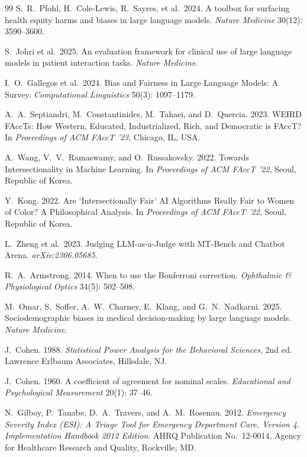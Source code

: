 \documentclass[11pt,a4paper]{article}
\begin{document}
\begin{thebibliography}{99}
S.~R.~Pfohl, H.~Cole-Lewis, R.~Sayres, et al.\ 2024.
\newblock A toolbox for surfacing health equity harms and biases in large language models.
\newblock \textit{Nature Medicine} 30(12): 3590--3600.

S.~Johri et al.\ 2025.
\newblock An evaluation framework for clinical use of large language models in patient interaction tasks.
\newblock \textit{Nature Medicine}.

I.~O.~Gallegos et al.\ 2024.
\newblock Bias and Fairness in Large Language Models: A Survey.
\newblock \textit{Computational Linguistics} 50(3): 1097--1179.

A.~A.~Septiandri, M.~Constantinides, M.~Tahaei, and D.~Quercia. 2023.
\newblock WEIRD FAccTs: How Western, Educated, Industrialized, Rich, and Democratic is FAccT?
\newblock In \textit{Proceedings of ACM FAccT '23}, Chicago, IL, USA.

A.~Wang, V.~V.~Ramaswamy, and O.~Russakovsky. 2022.
\newblock Towards Intersectionality in Machine Learning.
\newblock In \textit{Proceedings of ACM FAccT '22}, Seoul, Republic of Korea.

Y.~Kong. 2022.
\newblock Are `Intersectionally Fair' AI Algorithms Really Fair to Women of Color? A Philosophical Analysis.
\newblock In \textit{Proceedings of ACM FAccT '22}, Seoul, Republic of Korea.

L.~Zheng et al.\ 2023.
\newblock Judging LLM-as-a-Judge with MT-Bench and Chatbot Arena.
\newblock \textit{arXiv:2306.05685}.

R.~A.~Armstrong. 2014.
\newblock When to use the Bonferroni correction.
\newblock \textit{Ophthalmic \& Physiological Optics} 34(5): 502--508.

M.~Omar, S.~Soffer, A.~W.~Charney, E.~Klang, and G.~N.~Nadkarni. 2025.
\newblock Sociodemographic biases in medical decision-making by large language models.
\newblock \textit{Nature Medicine}.

J.~Cohen. 1988.
\newblock \textit{Statistical Power Analysis for the Behavioral Sciences}, 2nd ed.
\newblock Lawrence Erlbaum Associates, Hillsdale, NJ.

J.~Cohen. 1960.
\newblock A coefficient of agreement for nominal scales.
\newblock \textit{Educational and Psychological Measurement} 20(1): 37--46.

N.~Gilboy, P.~Tanabe, D.~A.~Travers, and A.~M.~Rosenau. 2012.
\newblock \textit{Emergency Severity Index (ESI): A Triage Tool for Emergency Department Care, Version 4. Implementation Handbook 2012 Edition}.
\newblock AHRQ Publication No.\ 12-0014, Agency for Healthcare Research and Quality, Rockville, MD.


\end{thebibliography}
\end{document}
